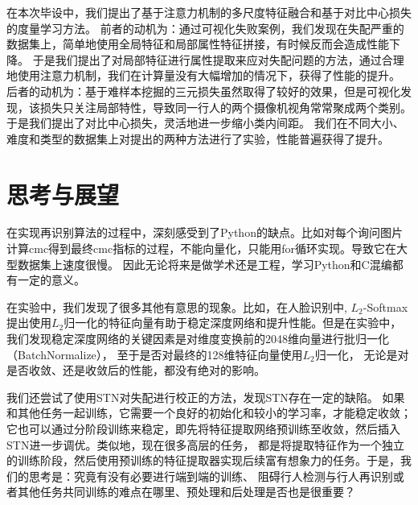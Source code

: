 在本次毕设中，我们提出了基于注意力机制的多尺度特征融合和基于对比中心损失的度量学习方法。
前者的动机为：通过可视化失败案例，我们发现在失配严重的数据集上，简单地使用全局特征和局部属性特征拼接，有时候反而会造成性能下降。
于是我们提出了对局部特征进行属性提取来应对失配问题的方法，通过合理地使用注意力机制，我们在计算量没有大幅增加的情况下，获得了性能的提升。
后者的动机为：基于难样本挖掘的三元损失虽然取得了较好的效果，但是可视化发现，该损失只关注局部特性，导致同一行人的两个摄像机视角常常聚成两个类别。
于是我们提出了对比中心损失，灵活地进一步缩小类内间距。
我们在不同大小、难度和类型的数据集上对提出的两种方法进行了实验，性能普遍获得了提升。

\section{思考与展望}

在实现再识别算法的过程中，深刻感受到了Python的缺点。比如对每个询问图片计算cmc得到最终cmc指标的过程，不能向量化，只能用for循环实现。导致它在大型数据集上速度很慢。
因此无论将来是做学术还是工程，学习Python和C混编都有一定的意义。

在实验中，我们发现了很多其他有意思的现象。比如，在人脸识别中,
$L_2$-Softmax提出使用$L_2$归一化的特征向量有助于稳定深度网络和提升性能。但是在实验中，我们发现稳定深度网络的关键因素是对维度变换前的2048维向量进行批归一化（BatchNormalize），
至于是否对最终的128维特征向量使用$L_2$归一化，
无论是对是否收敛、还是收敛后的性能，都没有绝对的影响。

我们还尝试了使用STN对失配进行校正的方法，发现STN存在一定的缺陷。
如果和其他任务一起训练，它需要一个良好的初始化和较小的学习率，才能稳定收敛；
它也可以通过分阶段训练来稳定，即先将特征提取网络预训练至收敛，然后插入STN进一步调优。类似地，现在很多高层的任务，
都是将提取特征作为一个独立的训练阶段，然后使用预训练的特征提取器实现后续富有想象力的任务。于是，我们的思考是：究竟有没有必要进行端到端的训练、
阻碍行人检测与行人再识别或者其他任务共同训练的难点在哪里、预处理和后处理是否也是很重要？


\printbibliography[heading=chapbib]

